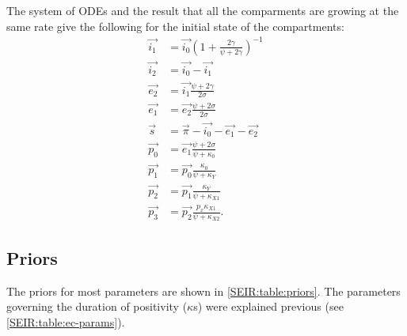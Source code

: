 \documentclass[thesis.tex]{subfiles}
\begin{document}
The system of ODEs and the result that all the comparments are growing at the same rate give the following for the initial state of the compartments:
\begin{align}
    \vec{i_1} &= \vec{i_0} \left(1 + \frac{2\gamma}{\psi + 2\gamma} \right)^{-1} \\
    \vec{i_2} &= \vec{i_0} - \vec{i_1} \\
    \vec{e_2} &= \vec{i_1} \frac{\psi + 2\gamma}{2\sigma} \\
    \vec{e_1} &= \vec{e_2} \frac{\psi + 2\sigma}{2\sigma} \\
    \vec{s} &= \vec{\pi} - \vec{i_0} - \vec{e_1} - \vec{e_2} \\
    \vec{p_0} &= \vec{e_1} \frac{\psi + 2\sigma}{\psi + \kappa_0} \\
    \vec{p_1} &= \vec{p_0} \frac{\kappa_0}{\psi + \kappa_Y} \\
    \vec{p_2} &= \vec{p_1} \frac{\kappa_Y}{\psi + \kappa_{X1}} \\
    \vec{p_3} &= \vec{p_2} \frac{p_x \kappa_{X1}}{\psi + \kappa_{X2}}.
\end{align}

\subsection{Priors}
The priors for most parameters are shown in \cref{SEIR:table:priors}.
The parameters governing the duration of positivity ($\kappa$s) were explained previous (see \cref{SEIR:table:ec-params}).
\end{document}
